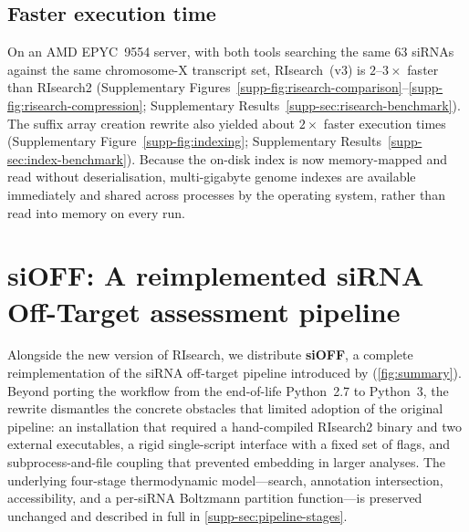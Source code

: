 \documentclass[unnumsec,webpdf,contemporary,large]{oup-authoring-template}
\begin{document}
\subsection*{Faster execution time}

On an AMD EPYC~9554 server, with both tools searching the same 63 siRNAs against the same chromosome-X transcript set, RIsearch~(v3) is $2$--$3\times$ faster than RIsearch2 (Supplementary Figures~\ref*{supp-fig:risearch-comparison}--\ref*{supp-fig:risearch-compression}; Supplementary Results~\ref*{supp-sec:risearch-benchmark}).
The suffix array creation rewrite also yielded about $2\times$ faster execution times (Supplementary Figure~\ref*{supp-fig:indexing}; Supplementary Results~\ref*{supp-sec:index-benchmark}).
Because the on-disk index is now memory-mapped and read without deserialisation, multi-gigabyte genome indexes are available immediately and shared across processes by the operating system, rather than read into memory on every run.

\section{siOFF: A reimplemented siRNA Off-Target assessment pipeline}\label{sec:pipeline}
Alongside the new version of RIsearch, we distribute \textbf{siOFF}, a complete reimplementation of the siRNA off-target pipeline introduced by \citet{alkan2017risearch2} (\cref{fig:summary}).
Beyond porting the workflow from the end-of-life Python~2.7 to Python~3, the rewrite dismantles the concrete obstacles that limited adoption of the original pipeline: an installation that required a hand-compiled RIsearch2 binary and two external executables, a rigid single-script interface with a fixed set of flags, and subprocess-and-file coupling that prevented embedding in larger analyses.
The underlying four-stage thermodynamic model---search, annotation intersection, accessibility, and a per-siRNA Boltzmann partition function---is preserved unchanged and described in full in \ref*{supp-sec:pipeline-stages}.
\end{document}
